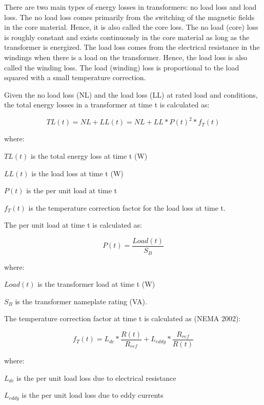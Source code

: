 There are two main types of energy losses in transformers: no load loss and load loss. The no load loss comes primarily from the switching of the magnetic fields in the core material. Hence, it is also called the core loss. The no load (core) loss is roughly constant and exists continuously in the core material as long as the transformer is energized. The load loss comes from the electrical resistance in the windings when there is a load on the transformer. Hence, the load loss is also called the winding loss. The load (winding) loss is proportional to the load squared with a small temperature correction.

Given the no load loss (NL) and the load loss (LL) at rated load and conditions, the total energy losses in a transformer at time t is calculated as:

\begin{equation}
TL(t) = NL + LL(t) = NL + LL*P{(t)^2}*{f_T}(t)
\label{eq:TotalEnergyLossesInTransformers}
\end{equation}

where:

\(TL(t)\) is the total energy loss at time t (W)

\(LL(t)\) is the load loss at time t (W)

\(P(t)\) is the per unit load at time t

\({f_T}(t)\) is the temperature correction factor for the load loss at time t.

The per unit load at time t is calculated as:

\begin{equation}
P(t) = \frac{{Load(t)}}{{{S_B}}}
\end{equation}

where:

\(Load(t)\) is the transformer load at time t (W)

\({S_B}\) is the transformer nameplate rating (VA).

The temperature correction factor at time t is calculated as (NEMA 2002):

\begin{equation}
{f_T}(t) = {L_{dc}}*\frac{{R(t)}}{{{R_{ref}}}} + {L_{eddy}}*\frac{{{R_{ref}}}}{{R(t)}}
\end{equation}

where:

\({L_{dc}}\) is the per unit load loss due to electrical resistance

\({L_{eddy}}\) is the per unit load loss due to eddy currents

